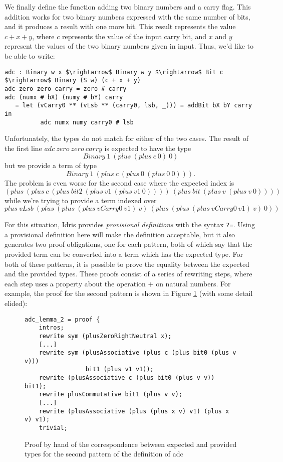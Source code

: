 We finally define the function adding two binary numbers and a carry flag.
This addition works for two binary numbers
expressed with the same number of bits, and it produces a result with one more
bit. This result represents the value $c + x + y$, where $c$ 
represents the value of the input carry bit, and $x$ and $y$ represent
the values of the two binary numbers given in input. Thus, we'd like to
be able to write:

\begin{lstlisting}
adc : Binary w x $\rightarrow$ Binary w y $\rightarrow$ Bit c $\rightarrow$ Binary (S w) (c + x + y)
adc zero zero carry = zero # carry
adc (numx # bX) (numy # bY) carry
   = let (vCarry0 ** (vLsb ** (carry0, lsb, _))) = addBit bX bY carry in
          adc numx numy carry0 # lsb
\end{lstlisting}

Unfortunately, the types do not match for either of the two cases. 
The result of the first line $adc\ zero\ zero\ carry$ is
expected to have the type\[Binary\ 1\ (plus\ (plus\ c\ 0)\ 0)\] but we
provide a term of type \[Binary\ 1\ (plus\ c\ (plus\ 0\ (plus\ 0\ 0))).\]
The problem is even worse for the second case where the expected index is 
\[(plus\ (plus\ c\ (plus\ bit2\ (plus\ v1\ (plus\ v1\ 0))))\ (plus\ bit\ (plus\ v\ (plus\ v\ 0))))\] while we're trying to provide a term indexed over 
\[plus\ vLsb\ (plus\ (plus\ (plus\ vCarry0\ v1)\ v)\ (plus\ (plus\ (plus\ vCarry0\ v1)\ v)\ 0))\]

For
this situation, Idris provides \emph{provisional definitions} with the 
syntax \texttt{?=}. Using a provisional definition here will make
the definition acceptable, but it also generates two proof obligations, one
for each pattern, both of which say that the provided term can be
converted into a term which has the expected type.  For both of these
patterns, it is possible to prove the equality between the expected and
the provided types. These proofs
consist of a series of rewriting steps, where each step uses a property about the
operation $+$ on natural numbers.  For example, the proof for the second
pattern is shown in Figure \ref{adc_lemma_2} (with some detail elided):

\begin{figure}[H]
\figrule
\begin{center}
\begin{lstlisting}
adc_lemma_2 = proof {
    intros;
    rewrite sym (plusZeroRightNeutral x);
    [...]
    rewrite sym (plusAssociative (plus c (plus bit0 (plus v v))) 
                 bit1 (plus v1 v1));
    rewrite (plusAssociative c (plus bit0 (plus v v)) bit1);
    rewrite plusCommutative bit1 (plus v v);
    [...]
    rewrite (plusAssociative (plus (plus x v) v1) (plus x v) v1);
    trivial;
\end{lstlisting}
\end{center}
\caption{Proof by hand of the correspondence between expected and provided types for the second pattern of the definition of adc}
\label{adc_lemma_2}
\figrule
\end{figure}


